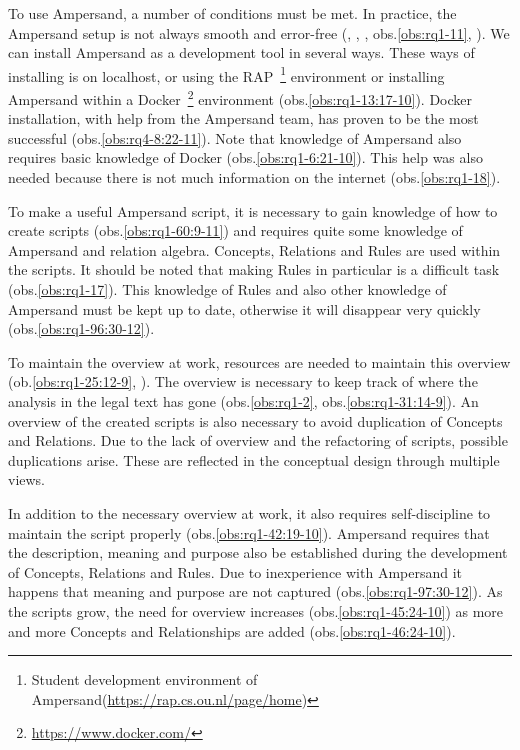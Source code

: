 To use Ampersand, a number of conditions must be met.
In practice, the Ampersand setup is not always smooth and error-free (, , , obs.\ref{obs:rq1-11}, ).
We can install Ampersand as a development tool in several ways.
These ways of installing is on localhost, or using the RAP~\footnote{Student development environment of Ampersand(\url{https://rap.cs.ou.nl/page/home})} environment or installing Ampersand within a Docker~\footnote{\url{https://www.docker.com/}} environment (obs.\ref{obs:rq1-13:17-10}).
Docker installation, with help from the Ampersand team, has proven to be the most successful (obs.\ref{obs:rq4-8:22-11}).
Note that knowledge of Ampersand also requires basic knowledge of Docker (obs.\ref{obs:rq1-6:21-10}).
This help was also needed because there is not much information on the internet (obs.\ref{obs:rq1-18}).
\label{s:1_2_script_creation}

To make a useful Ampersand script, it is necessary to gain knowledge of how to create scripts (obs.\ref{obs:rq1-60:9-11}) and 
requires quite some knowledge of Ampersand and relation algebra.
Concepts, Relations and Rules are used within the scripts.
It should be noted that making Rules in particular is a difficult task (obs.\ref{obs:rq1-17}).
This knowledge of Rules and also other knowledge of Ampersand must be kept up to date, otherwise it will disappear very quickly (obs.\ref{obs:rq1-96:30-12}).
\label{s:1_3_source_handling}

To maintain the overview at work, resources are needed to maintain this overview (ob.\ref{obs:rq1-25:12-9}, ).
The overview is necessary to keep track of where the analysis in the legal text has gone (obs.\ref{obs:rq1-2}, obs.\ref{obs:rq1-31:14-9}).
An overview of the created scripts is also necessary to avoid duplication of Concepts and Relations.
Due to the lack of overview and the refactoring of scripts, possible duplications arise.
These are reflected in the conceptual design through multiple views.
\label{s:1_4_script_overview}

In addition to the necessary overview at work, it also requires self-discipline to maintain the script properly (obs.\ref{obs:rq1-42:19-10}).
Ampersand requires that the description, meaning and purpose also be established during the development of Concepts, Relations and Rules.
Due to inexperience with Ampersand it happens that meaning and purpose are not captured (obs.\ref{obs:rq1-97:30-12}).
As the scripts grow, the need for overview increases (obs.\ref{obs:rq1-45:24-10}) as more and more Concepts and Relationships are added (obs.\ref{obs:rq1-46:24-10}).
\label{s:1_5_script_metadata}


